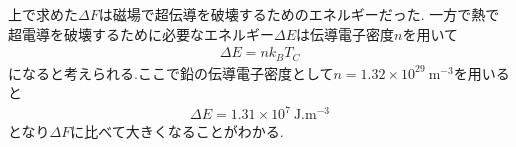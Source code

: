 上で求めた$\Delta F$は磁場で超伝導を破壊するためのエネルギーだった.
一方で熱で超電導を破壊するために必要なエネルギー$\Delta E$は伝導電子密度$n$を用いて
\begin{align}
  \Delta E=nk_BT_C
\end{align}
になると考えられる.ここで鉛の伝導電子密度として$n=1.32\times10^{29}\ \si{\metre^{-3}}$を用いると
\begin{align}
  \Delta E=1.31\times10^7\ \si{\joule.\metre^{-3}}
\end{align}
となり$\Delta F$に比べて大きくなることがわかる.
